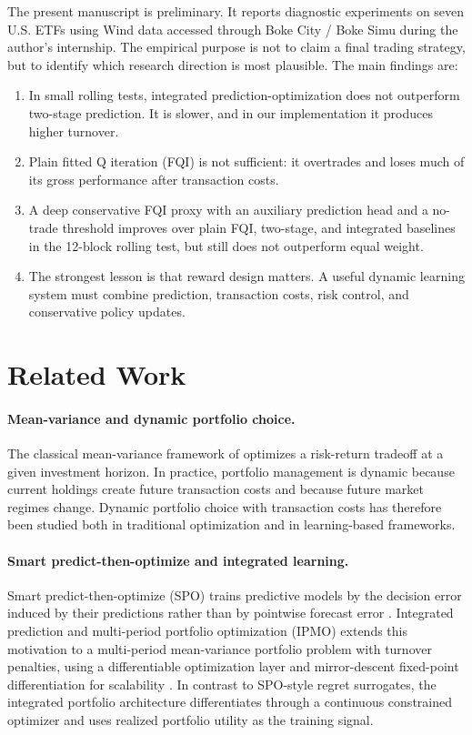 \documentclass[11pt]{article}
\begin{document}
The present manuscript is preliminary. It reports diagnostic experiments on seven U.S. ETFs using Wind data accessed through Boke City / Boke Simu during the author's internship. The empirical purpose is not to claim a final trading strategy, but to identify which research direction is most plausible. The main findings are:
\begin{enumerate}[leftmargin=*]
    \item In small rolling tests, integrated prediction-optimization does not outperform two-stage prediction. It is slower, and in our implementation it produces higher turnover.
    \item Plain fitted Q iteration (FQI) is not sufficient: it overtrades and loses much of its gross performance after transaction costs.
    \item A deep conservative FQI proxy with an auxiliary prediction head and a no-trade threshold improves over plain FQI, two-stage, and integrated baselines in the 12-block rolling test, but still does not outperform equal weight.
    \item The strongest lesson is that reward design matters. A useful dynamic learning system must combine prediction, transaction costs, risk control, and conservative policy updates.
\end{enumerate}

\section{Related Work}

\paragraph{Mean-variance and dynamic portfolio choice.}
The classical mean-variance framework of \citet{Markowitz1952} optimizes a risk-return tradeoff at a given investment horizon. In practice, portfolio management is dynamic because current holdings create future transaction costs and because future market regimes change. Dynamic portfolio choice with transaction costs has therefore been studied both in traditional optimization and in learning-based frameworks.

\paragraph{Smart predict-then-optimize and integrated learning.}
Smart predict-then-optimize (SPO) trains predictive models by the decision error induced by their predictions rather than by pointwise forecast error \citep{ElmachtoubGrigas2022}. Integrated prediction and multi-period portfolio optimization (IPMO) extends this motivation to a multi-period mean-variance portfolio problem with turnover penalties, using a differentiable optimization layer and mirror-descent fixed-point differentiation for scalability \citep{LinghuLiuDeng2025IPMO}. In contrast to SPO-style regret surrogates, the integrated portfolio architecture differentiates through a continuous constrained optimizer and uses realized portfolio utility as the training signal.
\end{document}
